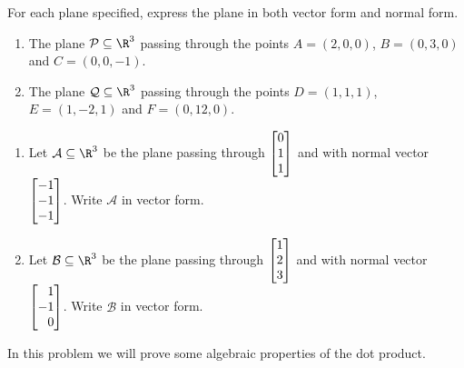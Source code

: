 \begin{exercises}
\begin{problist}
\begin{solution}
		\end{solution}
		
		\prob For each plane specified, express the plane in both vector form and normal form.
		\begin{enumerate}
			\item The plane $\mathcal P\subseteq\R^3$ passing through the points
			$A=(2,0,0)$, $B=(0,3,0)$ and $C=(0,0,-1)$.
			\item The plane $\mathcal Q\subseteq\R^3$ passing through the points
			$D=(1,1,1)$, $E=(1,-2,1)$ and $F=(0,12,0)$.
		\end{enumerate}
		\begin{solution}
		
		\end{solution}
		
		\prob
		\begin{enumerate}
			\item Let $\mathcal A\subseteq \R^3$ be the plane passing through $\mat{0\\1\\1}$
			and with normal vector $\mat{-1\\-1\\-1}$. Write $\mathcal A$ in vector form.
			\item Let $\mathcal B\subseteq \R^3$ be the plane passing through $\mat{1\\2\\3}$
			and with normal vector $\mat{1\\-1\\0}$. Write $\mathcal B$ in vector form.
		\end{enumerate}
		\begin{solution}
		
		\end{solution}
		
		\prob In this problem we will prove some algebraic properties of the dot product.
		\begin{enumerate}


\end{enumerate}
\end{problist}
\end{exercises}
